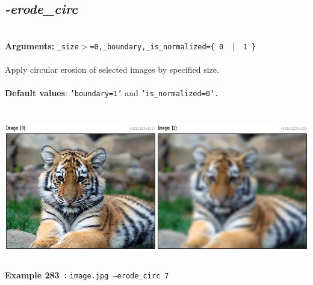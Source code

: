 \documentclass[a4paper,11pt,twoside]{book}
\begin{document}
\subsection{\emph{-erode\_circ} }\vspace*{-0.5em}
~\\\textbf{Arguments: } 
{\small \texttt{\_size$>$=0,\_boundary,\_is\_normalized=\{ 0 ~$|$~ 1 \}}}\\~\\
Apply circular erosion of selected images by specified size.
~\\~\\\textbf{Default values}: {\small \texttt{'boundary=1'} and \texttt{'is\_normalized=0'.}}
\begin{center}\includegraphics[keepaspectratio=true,height=7cm,width=\textwidth]{img/gmic_def283.jpg}\\
{\footnotesize \textbf{Example 283~:} \texttt{image.jpg --erode\_circ 7}}
\end{center}
\end{document}
